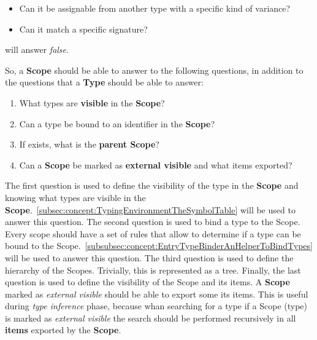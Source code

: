 \begin{itemize}
    \item Can it be assignable from another type with a specific kind of variance?
    \item Can it match a specific signature?
\end{itemize}

will answer \textit{false}.

So, a \textbf{Scope} should be able to answer to the following questions, in addition to the questions that a \textbf{Type} should be able to answer:

\begin{enumerate}
    \item What types are \textbf{visible} in the \textbf{Scope}?
    \item Can a type be bound to an identifier in the \textbf{Scope}?
    \item If exists, what is the \textbf{parent Scope}?
    \item Can a \textbf{Scope} be marked as \textbf{external visible} and what items exported?
\end{enumerate}

The first question is used to define the visibility of the type in the \textbf{Scope} and knowing what types are visible in the \textbf{Scope}.~\ref{subsec:concept:TypingEnvironmentTheSymbolTable} will be used to answer this question.
The second question is used to bind a type to the Scope. Every scope should have a set of rules that allow to determine if a type can be bound to the Scope.~\ref{subsubsec:concept:EntryTypeBinderAnHelperToBindTypes} will be used to answer this question.
The third question is used to define the hierarchy of the Scopes. Trivially, this is represented as a tree.
Finally, the last question is used to define the visibility of the Scope and its items. A \textbf{Scope} marked as \textit{external visible} should be able to export some its items. This is useful during \textit{type inference} phase, because whan searching for a type if a Scope (type) is marked as \textit{external visible} the search should be performed recursively in all \textbf{items} exported by the \textbf{Scope}.

